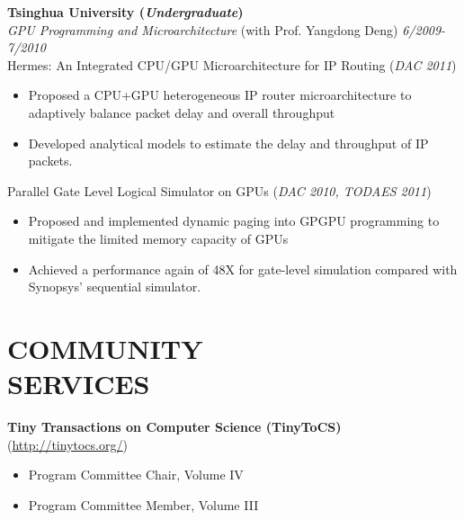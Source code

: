 \documentclass[margin, 9pt]{res} %
\begin{document}
\begin{resume}
\bigskip
{\large\textbf{Tsinghua University (\textit{Undergraduate})}}\\

\vspace*{-7pt}
{\large\textit{GPU Programming and Microarchitecture} (with Prof. Yangdong Deng)} \hfill\textit{6/2009-7/2010}\\

\vspace*{-7pt}
Hermes: An Integrated CPU/GPU Microarchitecture for IP Routing \hfill(\textit{DAC 2011})\\
\vspace*{-10pt}
\begin{itemize}[leftmargin=*] \itemsep -3pt
\vspace*{-5pt}
	\item Proposed a CPU+GPU heterogeneous IP router microarchitecture to adaptively balance packet delay and overall throughput
	\item Developed analytical models to estimate the delay and throughput of IP packets.
\end{itemize}

\medskip
Parallel Gate Level Logical Simulator on GPUs \hfill(\textit{DAC 2010, TODAES 2011})\\
\vspace*{-10pt}
\begin{itemize}[leftmargin=*] \itemsep -3pt
\vspace*{-5pt}
	\item Proposed and implemented dynamic paging into GPGPU programming to mitigate the limited memory capacity of GPUs
	\item Achieved a performance again of 48X for gate-level simulation compared with Synopsys' sequential simulator.
\end{itemize}


\section{COMMUNITY\\ SERVICES}

\textbf{Tiny Transactions on Computer Science (TinyToCS)} (\url{http://tinytocs.org/})
\begin{itemize}[leftmargin=*] \itemsep -3pt
\vspace*{-4pt}
	\item Program Committee Chair, Volume IV \par
	\item Program Committee Member, Volume III \par
\end{itemize}


\end{resume}
\end{document}
